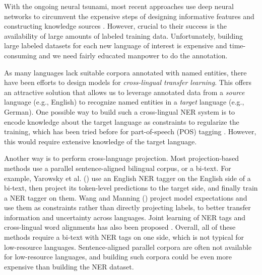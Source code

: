 \documentclass[letterpaper]{article} \usepackage{aaai20}  \usepackage{times}  \usepackage{helvet} \usepackage{courier}  \usepackage[hyphens]{url}  \usepackage{graphicx} \urlstyle{rm} \def\UrlFont{\rm}  \usepackage{graphicx}  \frenchspacing  \setlength{\pdfpagewidth}{8.5in}  \setlength{\pdfpageheight}{11in}
\begin{document}
With the ongoing neural tsunami, most recent approaches use deep neural networks to circumvent the expensive steps of designing informative features and constructing knowledge sources \cite{lampleNER,MaH16,Strubell:2017,DBLP:journals/corr/PetersABP17,akbik2018coling,BERT}. However, crucial to their success is the availability of large amounts of labeled training data. Unfortunately, building large labeled datasets for each new language of interest is expensive and time-consuming and we need fairly educated manpower to do the annotation. 

As many languages lack suitable corpora annotated with named entities, there have been efforts to design models for \emph{cross-lingual transfer learning}. This offers an attractive solution that allows us to leverage annotated data from a \emph{source} language (e.g., English) to recognize named entities in a \emph{target} language (e.g., German). One possible way to build such a cross-lingual NER system is to encode knowledge about the target language as constraints to regularize the training, which has been tried before for part-of-speech (POS) tagging \cite{Ganchev2010}. However, this would require extensive knowledge of the target language.

Another way is to perform cross-language projection. Most projection-based methods use a parallel sentence-aligned bilingual corpus, or a bi-text. For example, Yarowsky et al.  (\citeyear{Yarowsky:2001:IMT:1072133.1072187}) use an English NER tagger on the English side of a bi-text, then project its token-level predictions to the target side, and finally train a NER tagger on them. Wang and Manning (\citeyear{Wang-TACL-2014}) project model expectations and use them as constraints rather than directly projecting labels, to better transfer information and uncertainty across languages. Joint learning of NER tags and cross-lingual word alignments has also been proposed \cite{wang-che-manning:2013:ACL2013}. Overall, all of these methods require a bi-text with NER tags on one side, which is not typical for {low-resource} languages. Sentence-aligned parallel corpora are often not available for low-resource languages, and building such corpora could be even more expensive than building the NER dataset.
\end{document}
